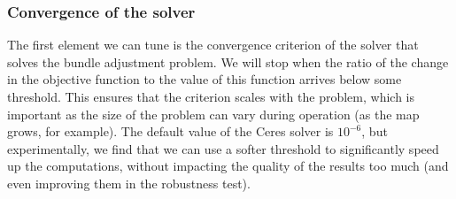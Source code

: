 \subsubsection{Convergence of the solver}
The first element we can tune is the convergence criterion of the solver that solves the bundle adjustment problem. We will stop when the ratio of the change in the objective function to the value of this function arrives below some threshold. This ensures that the criterion scales with the problem, which is important as the size of the problem can vary during operation (as the map grows, for example). The default value of the Ceres solver is $10^{-6}$, but experimentally, we find that we can use a softer threshold to significantly speed up the computations, without impacting the quality of the results too much (and even improving them in the robustness test).

